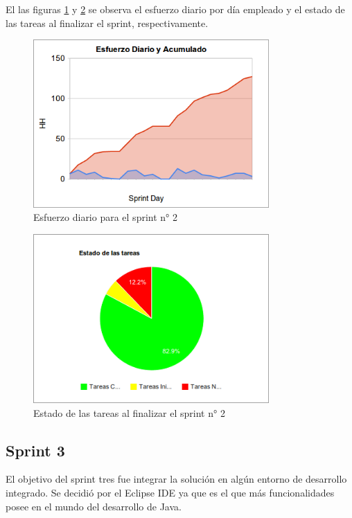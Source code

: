 \documentclass[12pt,a4paper]{article}
\begin{document}
El las figuras \ref{sprint2-esfuerzo} y \ref{sprint2-tareas-fin} se observa el esfuerzo diario por día empleado
y el estado de las tareas al finalizar el sprint, respectivamente.

	\begin{figure}[!ht]
		\begin{center}
			\includegraphics[width=9cm]{sprint2-esfuerzo-diario.png}
			\caption{\label{sprint2-esfuerzo} Esfuerzo diario para el sprint n° 2 }
		\end{center}
	\end{figure}

	\begin{figure}[!ht]
		\begin{center}
			\includegraphics[width=9cm]{sprint2-tareas.png}
			\caption{\label{sprint2-tareas-fin} Estado de las tareas al finalizar el sprint n° 2 }
		\end{center}
	\end{figure}

\subsection{Sprint 3}

El objetivo del sprint tres fue integrar la solución en algún entorno de desarrollo integrado. Se decidió por el Eclipse IDE
ya que es el que más funcionalidades posee en el mundo del desarrollo de Java.
\end{document}
